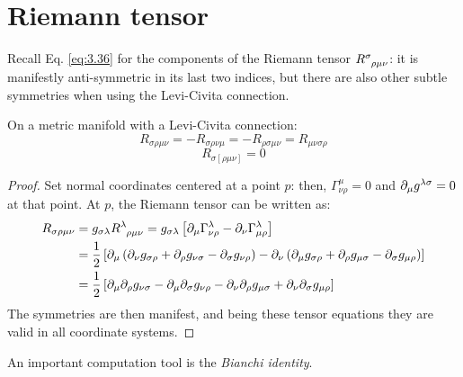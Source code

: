 \section{Riemann tensor}

Recall Eq. \ref{eq:3.36} for the components of the Riemann tensor $ \tensor{R}{^\sigma _{\rho \mu \nu}} $: it is manifestly anti-symmetric in its last two indices, but there are also other subtle symmetries when using the Levi-Civita connection.

\begin{proposition}
  On a metric manifold with a Levi-Civita connection:
  \begin{equation}
    R_{\sigma \rho \mu \nu} = - R_{\sigma \rho \nu \mu} = - R_{\rho \sigma \mu \nu} = R_{\mu \nu \sigma \rho}
    \label{eq:3.59}
  \end{equation}
  \begin{equation}
    R_{\sigma [\rho \mu \nu]} = 0
    \label{eq:3.60}
  \end{equation}
\end{proposition}
\begin{proof}
  Set normal coordinates centered at a point $ p $: then, $ \Gamma^\mu_{\nu \rho} = 0 $ and $ \partial_\mu g^{\lambda \sigma} = 0 $ at that point. At $ p $, the Riemann tensor can be written as:
  \begin{equation*}
    \begin{split}
      R_{\sigma \rho \mu \nu}
      &= g_{\sigma \lambda} \tensor{R}{^\lambda _{\rho \mu \nu}} = g_{\sigma \lambda} \left[ \pa_\mu \Gamma^\lambda_{\nu \rho} - \pa_\nu \Gamma^\lambda_{\mu \rho} \right] \\
      &= \frac{1}{2} \left[ \pa_\mu \left( \pa_\nu g_{\sigma \rho} + \pa_\rho g_{\nu \sigma} - \pa_\sigma g_{\nu \rho} \right) - \pa_\nu \left( \pa_\mu g_{\sigma \rho} + \pa_\rho g_{\mu \sigma} - \pa_\sigma g_{\mu \rho} \right) \right] \\
      &= \frac{1}{2} \left[ \pa_\mu \pa_\rho g_{\nu \sigma} - \pa_\mu \pa_\sigma g_{\nu \rho} - \pa_\nu \pa_\rho g_{\mu \sigma} + \pa_\nu \pa_\sigma g_{\mu \rho} \right]
    \end{split}
  \end{equation*}
  The symmetries are then manifest, and being these tensor equations they are valid in all coordinate systems.
\end{proof}

An important computation tool is the \textit{Bianchi identity}.

